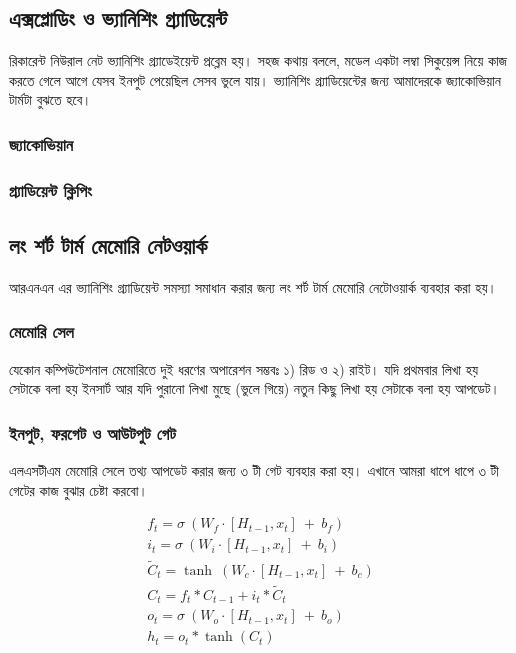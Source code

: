 \documentclass{article}[book]
\begin{document}
\subsection{এক্সপ্লোডিং ও ভ্যানিশিং গ্র্যাডিয়েন্ট}
রিকারেন্ট নিউরাল নেট ভ্যানিশিং গ্র্যাডেইয়েন্ট প্রব্লেম হয়। সহজ কথায় বললে, মডেল একটা লম্বা সিকুয়েন্স নিয়ে কাজ করতে গেলে আগে যেসব ইনপুট পেয়েছিল সেসব ভুলে যায়।
ভ্যানিশিং গ্র্যাডিয়েন্টের জন্য আমাদেরকে জ্যাকোভিয়ান টার্মটা বুঝতে হবে। 

\subsubsection{জ্যাকোভিয়ান}
\subsubsection{গ্র্যাডিয়েন্ট ক্লিপিং}

\subsection{লং শর্ট টার্ম মেমোরি নেটওয়ার্ক}
আরএনএন এর ভ্যানিশিং গ্র্যাডিয়েন্ট সমস্যা সমাধান করার জন্য লং শর্ট টার্ম মেমোরি নেটোওয়ার্ক ব্যবহার করা হয়। 
\subsubsection{মেমোরি সেল}
যেকোন কম্পিউটেশনাল মেমোরিতে দুই ধরণের অপারেশন সম্ভবঃ ১) রিড ও ২) রাইট। যদি প্রথমবার লিখা হয় সেটাকে বলা হয় ইনসার্ট আর যদি পুরানো লিখা মুছে (ভুলে গিয়ে) নতুন কিছু লিখা হয় সেটাকে বলা হয় আপডেট। 
 
\subsubsection{ইনপুট, ফরগেট ও আউটপুট গেট}
এলএসটীএম মেমোরি সেলে তথ্য আপডেট করার জন্য ৩ টী গেট ব্যবহার করা হয়। এখানে আমরা ধাপে ধাপে ৩ টী গেটের কাজ বুঝার চেষ্টা করবো। 
 
\begin{align} %
   f_t = \sigma \ (W_f \cdot [H_{t-1} , x_t] \ + \ b_f) \\
   i_t = \sigma \ (W_i \cdot [H_{t-1} , x_t] \ + \ b_i) \\
   \tilde C_t = \tanh \ (W_c \cdot [H_{t-1} , x_t] \ + \ b_c) \\
   C_t = f_t * C_{t-1} + i_t * \tilde C_t \\
   o_t = \sigma \ (W_o \cdot [H_{t-1} , x_t] \ + \ b_o) \\ 
   h_t = o_t * \tanh(C_t) \\ 
\end{align}
\end{document}
